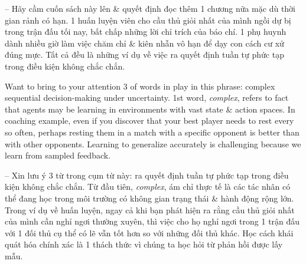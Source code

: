\documentclass{article}
\begin{document}
\begin{itemize}
    -- Hãy cầm cuốn sách này lên \& quyết định đọc thêm 1 chương nữa mặc dù thời gian rảnh có hạn. 1 huấn luyện viên cho cầu thủ giỏi nhất của mình ngồi dự bị trong trận đấu tối nay, bất chấp những lời chỉ trích của báo chí. 1 phụ huynh dành nhiều giờ làm việc chăm chỉ \& kiên nhẫn vô hạn để dạy con cách cư xử đúng mực. Tất cả đều là những ví dụ về việc ra quyết định tuần tự phức tạp trong điều kiện không chắc chắn.

    Want to bring to your attention 3 of words in play in this phrase: complex sequential decision-making under uncertainty. 1st word, {\it complex}, refers to fact that agents may be learning in environments with vast state \& action spaces. In coaching example, even if you discover that your best player needs to rest every so often, perhaps resting them in a match with a specific opponent is better than with other opponents. Learning to generalize accurately is challenging because we learn from sampled feedback.

    -- Xin lưu ý 3 từ trong cụm từ này: ra quyết định tuần tự phức tạp trong điều kiện không chắc chắn. Từ đầu tiên, {\it complex}, ám chỉ thực tế là các tác nhân có thể đang học trong môi trường có không gian trạng thái \& hành động rộng lớn. Trong ví dụ về huấn luyện, ngay cả khi bạn phát hiện ra rằng cầu thủ giỏi nhất của mình cần nghỉ ngơi thường xuyên, thì việc cho họ nghỉ ngơi trong 1 trận đấu với 1 đối thủ cụ thể có lẽ vẫn tốt hơn so với những đối thủ khác. Học cách khái quát hóa chính xác là 1 thách thức vì chúng ta học hỏi từ phản hồi được lấy mẫu.


\end{itemize}
\end{document}
